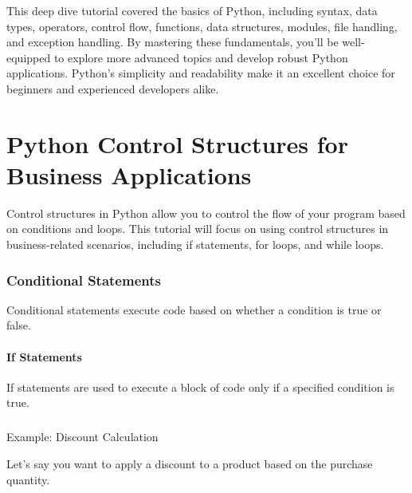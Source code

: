 \documentclass[
  letterpaper,
  DIV=11,
  numbers=noendperiod]{scrreprt}
\makeatletter
\let\oldparagraph\paragraph
\renewcommand{\paragraph}{
    \@ifstar
      \xxxParagraphStar
      \xxxParagraphNoStar
  }
\newcommand{\xxxParagraphStar}[1]{\oldparagraph*{#1}\mbox{}}
\newcommand{\xxxParagraphNoStar}[1]{\oldparagraph{#1}\mbox{}}
\newenvironment{Shaded}{\begin{snugshade}}{\end{snugshade}}
\newcommand{\BuiltInTok}[1]{\textcolor[rgb]{0.00,0.23,0.31}{#1}}
\newcommand{\CommentTok}[1]{\textcolor[rgb]{0.37,0.37,0.37}{#1}}
\newcommand{\ControlFlowTok}[1]{\textcolor[rgb]{0.00,0.23,0.31}{\textbf{#1}}}
\newcommand{\DecValTok}[1]{\textcolor[rgb]{0.68,0.00,0.00}{#1}}
\newcommand{\FloatTok}[1]{\textcolor[rgb]{0.68,0.00,0.00}{#1}}
\newcommand{\NormalTok}[1]{\textcolor[rgb]{0.00,0.23,0.31}{#1}}
\newcommand{\OperatorTok}[1]{\textcolor[rgb]{0.37,0.37,0.37}{#1}}
\newcommand{\SpecialCharTok}[1]{\textcolor[rgb]{0.37,0.37,0.37}{#1}}
\newcommand{\SpecialStringTok}[1]{\textcolor[rgb]{0.13,0.47,0.30}{#1}}
\makeatother
\begin{document}
This deep dive tutorial covered the basics of Python, including syntax,
data types, operators, control flow, functions, data structures,
modules, file handling, and exception handling. By mastering these
fundamentals, you'll be well-equipped to explore more advanced topics
and develop robust Python applications. Python's simplicity and
readability make it an excellent choice for beginners and experienced
developers alike.


\chapter{Python Control Structures for Business
Applications}\label{python-control-structures-for-business-applications}

Control structures in Python allow you to control the flow of your
program based on conditions and loops. This tutorial will focus on using
control structures in business-related scenarios, including if
statements, for loops, and while loops.

\subsection{Conditional Statements}\label{conditional-statements-2}

Conditional statements execute code based on whether a condition is true
or false.

\subsubsection{If Statements}\label{if-statements}

If statements are used to execute a block of code only if a specified
condition is true.

\paragraph{Example: Discount
Calculation}\label{example-discount-calculation}

Let's say you want to apply a discount to a product based on the
purchase quantity.

\begin{Shaded}
\end{Shaded}
\end{document}
